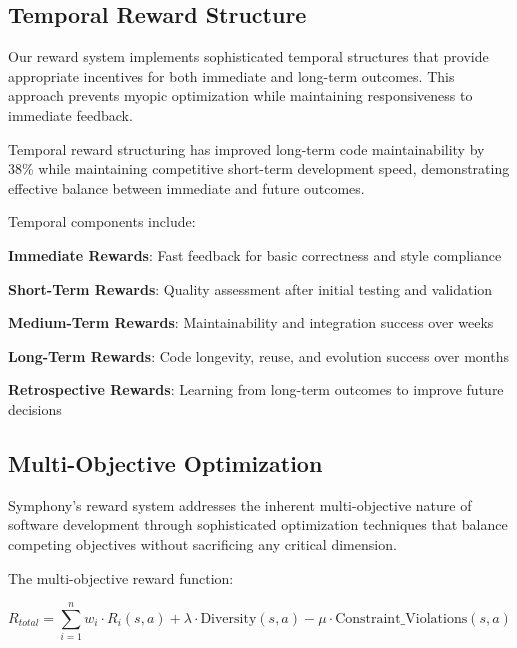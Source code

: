 \subsection*{Temporal Reward Structure}

Our reward system implements sophisticated temporal structures that provide appropriate incentives for both immediate and long-term outcomes. This approach prevents myopic optimization while maintaining responsiveness to immediate feedback.

\begin{successbox}
Temporal reward structuring has improved long-term code maintainability by 38\% while maintaining competitive short-term development speed, demonstrating effective balance between immediate and future outcomes.
\end{successbox}

Temporal components include:

\begin{expandedlist}
    \item \textbf{Immediate Rewards}: Fast feedback for basic correctness and style compliance
    \item \textbf{Short-Term Rewards}: Quality assessment after initial testing and validation
    \item \textbf{Medium-Term Rewards}: Maintainability and integration success over weeks
    \item \textbf{Long-Term Rewards}: Code longevity, reuse, and evolution success over months
    \item \textbf{Retrospective Rewards}: Learning from long-term outcomes to improve future decisions
\end{expandedlist}

\subsection*{Multi-Objective Optimization}

Symphony's reward system addresses the inherent multi-objective nature of software development through sophisticated optimization techniques that balance competing objectives without sacrificing any critical dimension.

The multi-objective reward function:

\begin{equation}
R_{total} = \sum_{i=1}^{n} w_i \cdot R_i(s, a) + \lambda \cdot \text{Diversity}(s, a) - \mu \cdot \text{Constraint\_Violations}(s, a)
\end{equation}

